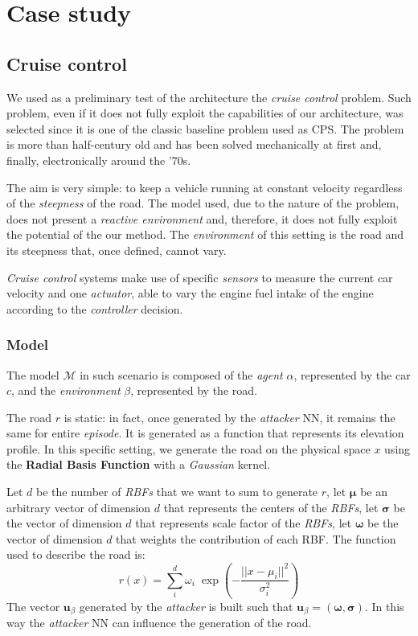\chapter{Case study}

\section{Cruise control}
We used as a preliminary test of the architecture the \textit{cruise control} problem.
Such problem, even if it does not fully exploit the capabilities of our architecture, was selected since it is one of the classic baseline problem used as CPS.
The problem is more than half-century old and has been solved mechanically \cite{teetor1948mech_cc} at first and, finally, electronically \cite{wisner1971elect_cc} around the '70s.

The aim is very simple: to keep a vehicle running at constant velocity regardless of the \textit{steepness} of the road.
The model used, due to the nature of the problem, does not present a \textit{reactive environment} and, therefore, it does not fully exploit the potential of the our method.
The \textit{environment} of this setting is the road and its steepness that, once defined, cannot vary.

\textit{Cruise control} systems make use of specific \textit{sensors} to measure the current car velocity and one \textit{actuator}, able to vary the engine fuel intake of the engine according to the \textit{controller} decision.

\subsection{Model}
The model $\mathcal{M}$ in such scenario is composed of the \textit{agent} $\alpha$, represented by the car $c$, and the \textit{environment} $\beta$, represented by the road.

The road $r$ is static: in fact, once generated by the \textit{attacker} NN, it remains the same for entire \textit{episode}.
It is generated as a function that represents its elevation profile.
In this specific setting, we generate the road on the physical space $x$ using the \textbf{Radial Basis Function} with a \textit{Gaussian} kernel.

Let $d$ be the number of \textit{RBFs} that we want to sum to generate $r$, let $\pmb{\mu}$ be an arbitrary vector of dimension $d$ that represents the centers of the \textit{RBFs}, let $\pmb{\sigma}$ be the vector of dimension $d$ that represents scale factor of the \textit{RBFs},
let $\pmb{\omega}$ be the vector of dimension $d$ that weights the contribution of each RBF.
The function used to describe the road is:
$$ r(x) = \sum_i^d \omega_i \; \exp \left(- \frac{\lvert\lvert x - \mu_i \rvert\rvert^2}{\sigma_i^2}\right) $$
The vector $\textbf{u}_\beta$ generated by the \textit{attacker} is built such that $\textbf{u}_\beta = (\pmb{\omega}, \pmb{\sigma})$.
In this way the \textit{attacker} NN can influence the generation of the road.

